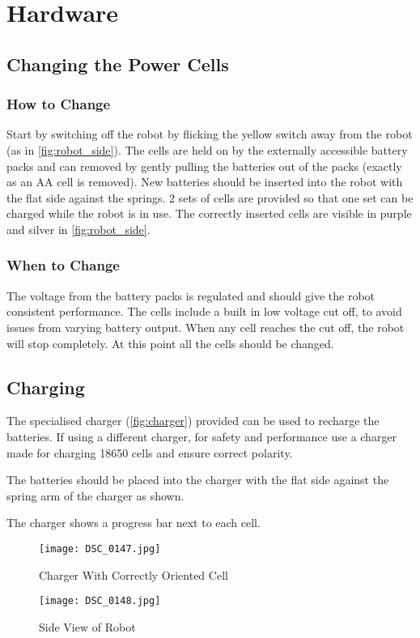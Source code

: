 
\section{Hardware}

\subsection{Changing the Power Cells}
\subsubsection{How to Change}
Start by switching off the robot by flicking the yellow switch away from the robot (as in \autoref{fig:robot_side}). The cells are held on by the externally accessible battery packs and can removed by gently pulling the batteries out of the packs (exactly as an AA cell is removed). New batteries should be inserted into the robot with the flat side against the springs. 2 sets of cells are provided so that one set can be charged while the robot is in use. The correctly inserted cells are visible in purple and silver in \autoref{fig:robot_side}.

\subsubsection{When to Change}
The voltage from the battery packs is regulated and should give the robot consistent performance. The cells include a built in low voltage cut off, to avoid issues from varying battery output. When any cell reaches the cut off, the robot will stop completely. At this point all the cells should be changed. 


\subsection{Charging}
The specialised charger (\autoref{fig:charger}) provided can be used to recharge the batteries. If using a different charger, for safety and performance use a charger made for charging 18650 cells and ensure correct polarity.

The batteries should be placed into the charger with the flat side against the spring arm of the charger as shown.

The charger shows a progress bar next to each cell. 


\begin{figure}[hp]
\centering
\texttt{[image: DSC\_0147.jpg]}
\caption{Charger With Correctly Oriented Cell}
\label{fig:charger}
\end{figure}
\begin{figure}[hp]
\centering
\texttt{[image: DSC\_0148.jpg]}
\caption{Side View of Robot}
\label{fig:robot_side}
\end{figure}



